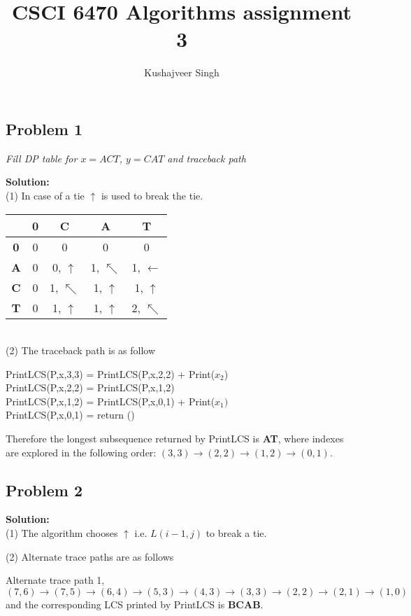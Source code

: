 \documentclass[12pt,a4paper]{article}
\title{CSCI 6470 Algorithms assignment 3}
\author{Kushajveer Singh}
\date{}
\newcommand{\solution}{\noindent\textbf{Solution:}\\\indent}
\begin{document}
\maketitle

\subsection*{Problem 1}
\textit{
    Fill DP table for $x=ACT$, $y=CAT$ and traceback path
}

\solution
(1) In case of a tie $\uparrow$ is used to break the tie. \\

\begin{tabular}{|c|c|c|c|c|}
\hline
& \textbf{0} & \textbf{C} & \textbf{A} & \textbf{T} \\
\hline
\textbf{0} & 0 & 0 & 0 & 0 \\
\hline
\textbf{A} & 0 & 0, $\uparrow$ & 1, $\nwarrow$ & 1, $\leftarrow$ \\
\hline 
\textbf{C} & 0 & 1, $\nwarrow$ & 1, $\uparrow$ & 1, $\uparrow$ \\
\hline
\textbf{T} & 0 & 1, $\uparrow$ & 1, $\uparrow$ & 2, $\nwarrow$ \\
\hline
\end{tabular} \\

(2) The traceback path is as follow

\noindent PrintLCS(P,x,3,3) = PrintLCS(P,x,2,2) + Print($x_2$) \\
PrintLCS(P,x,2,2) = PrintLCS(P,x,1,2) \\
PrintLCS(P,x,1,2) = PrintLCS(P,x,0,1) + Print($x_1)$ \\
PrintLCS(P,x,0,1) = return ()

Therefore the longest subsequence returned by PrintLCS is \textbf{AT}, where indexes are explored in the following order: $(3,3) \rightarrow (2,2) \rightarrow (1,2) \rightarrow (0,1)$.


\subsection*{Problem 2}
\solution
(1) The algorithm chooses $\uparrow$ i.e. $L(i-1,j)$ to break a tie.

(2) Alternate trace paths are as follows

Alternate trace path 1,
\begin{equation*}
    (7,6) \rightarrow (7,5) \rightarrow (6,4) \rightarrow (5,3) \rightarrow (4,3) \rightarrow (3,3) \rightarrow (2,2) \rightarrow (2,1) \rightarrow (1,0)
\end{equation*}
and the corresponding LCS printed by PrintLCS is \textbf{BCAB}.
\end{document}
